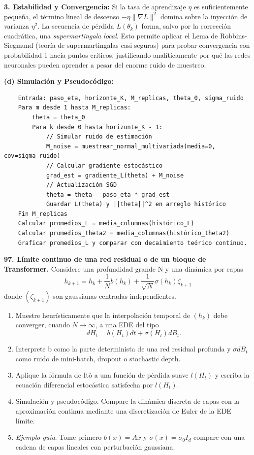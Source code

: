 \documentclass[11pt, letterpaper]{article}
\begin{document}
\begin{solucion}
    \textbf{3. Estabilidad y Convergencia:}
    Si la tasa de aprendizaje $\eta$ es suficientemente pequeña, el término lineal de descenso $-\eta \|\nabla L\|^2$ domina sobre la inyección de varianza $\eta^2$. La secuencia de pérdida $L(\theta_k)$ forma, salvo por la corrección cuadrática, una \textit{supermartingala local}. Esto permite aplicar el Lema de Robbins-Siegmund (teoría de supermartingalas casi seguras) para probar convergencia con probabilidad 1 hacia puntos críticos, justificando analíticamente por qué las redes neuronales pueden aprender a pesar del enorme ruido de muestreo.

    \textbf{(d) Simulación y Pseudocódigo:}
    \begin{verbatim}
    Entrada: paso_eta, horizonte_K, M_replicas, theta_0, sigma_ruido
    Para m desde 1 hasta M_replicas:
        theta = theta_0
        Para k desde 0 hasta horizonte_K - 1:
            // Simular ruido de estimación
            M_noise = muestrear_normal_multivariada(media=0, cov=sigma_ruido)
            // Calcular gradiente estocástico
            grad_est = gradiente_L(theta) + M_noise
            // Actualización SGD
            theta = theta - paso_eta * grad_est
            Guardar L(theta) y ||theta||^2 en arreglo histórico
    Fin M_replicas
    Calcular promedios_L = media_columnas(histórico_L)
    Calcular promedios_theta2 = media_columnas(histórico_theta2)
    Graficar promedios_L y comparar con decaimiento teórico continuo.
    \end{verbatim}
\end{solucion}

\newpage

\begin{ejercicio}
    \textbf{97. Límite continuo de una red residual o de un bloque de Transformer.} Considere una profundidad grande N y una dinámica por capas
    \[ h_{k+1}=h_{k}+\frac{1}{N}b(h_{k})+\frac{1}{\sqrt{N}}\sigma(h_{k})\zeta_{k+1} \]
    donde $(\zeta_{k+1})$ son gaussianas centradas independientes.
    \begin{enumerate}
        \item Muestre heurísticamente que la interpolación temporal de $(h_{k})$ debe converger, cuando $N\rightarrow\infty$, a una EDE del tipo
        \[ dH_{t}=b(H_{t})dt+\sigma(H_{t})dB_{t}. \]
        \item Interprete b como la parte determinista de una red residual profunda y $\sigma dB_{t}$ como ruido de mini-batch, dropout o stochastic depth.
        \item Aplique la fórmula de Itô a una función de pérdida suave $l(H_{t})$ y escriba la ecuación diferencial estocástica satisfecha por $l(H_{t})$.
        \item Simulación y pseudocódigo. Compare la dinámica discreta de capas con la aproximación continua mediante una discretización de Euler de la EDE límite.
        \item \textit{Ejemplo guía}. Tome primero $b(x)=Ax$ y $\sigma(x)=\sigma_{0}I_{d}$ compare con una cadena de capas lineales con perturbación gaussiana.
    \end{enumerate}
\end{ejercicio}
\end{document}
